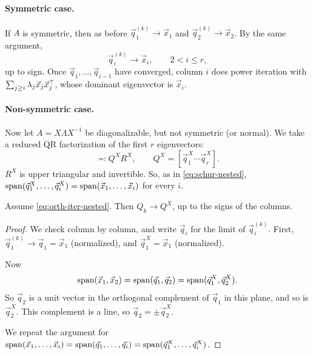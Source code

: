 \paragraph{Symmetric case.} If $A$ is symmetric, then as before $\vec{q}_1^{(k)} \to \vec{x}_1$ and $\vec{q}_2^{(k)} \to \vec{x}_2$. By the same argument,
\begin{equation}
  \vec{q}_i^{(k)} \longrightarrow \vec{x}_i, \qquad 2 < i \le r,
\end{equation}
up to sign. Once $\vec{q}_1, \dots, \vec{q}_{i-1}$ have converged, column $i$ does power iteration with $\sum_{j \ge i}\lambda_j\vec{x}_j\vec{x}_j^\top$, whose dominant eigenvector is $\vec{x}_i$.

\paragraph{Non-symmetric case.} Now let $A = X\Lambda X^{-1}$ be diagonalizable, but not symmetric (or normal). We take a reduced QR factorization of the first $r$ eigenvectors:
\begin{equation}
  [\vec{x}_1 \cdots \vec{x}_r] \eqqcolon Q^XR^X, \qquad Q^X = [\vec{q}_1^X \cdots \vec{q}_r^X].
  \label{eq:orth-iter-QX}
\end{equation}
$R^X$ is upper triangular and invertible. So, as in \cref{eq:schur-nested}, $\operatorname{span}(\vec{q}_1^X, \dots, \vec{q}_i^X) = \operatorname{span}(\vec{x}_1, \dots, \vec{x}_i)$ for every $i$.

\begin{proposition}
  \label{prop:orth-iter-QX}
  Assume \cref{eq:orth-iter-nested}. Then $Q_k \to Q^X$, up to the signs of the columns.
\end{proposition}

\begin{proof}
  We check column by column, and write $\vec{q}_i$ for the limit of $\vec{q}_i^{(k)}$. First, $\vec{q}_1^{(k)} \to \vec{q}_1 = \vec{x}_1$ (normalized), and $\vec{q}_1^X = \vec{x}_1$ (normalized).

  Now
  \begin{equation}
    \operatorname{span}(\vec{x}_1, \vec{x}_2) = \operatorname{span}(\vec{q}_1, \vec{q}_2) = \operatorname{span}(\vec{q}_1^X, \vec{q}_2^X).
  \end{equation}
  So $\vec{q}_2$ is a unit vector in the orthogonal complement of $\vec{q}_1$ in this plane, and so is $\vec{q}_2^X$. This complement is a line, so $\vec{q}_2 = \pm\vec{q}_2^X$.

  We repeat the argument for $\operatorname{span}(\vec{x}_1, \dots, \vec{x}_i) = \operatorname{span}(\vec{q}_1, \dots, \vec{q}_i) = \operatorname{span}(\vec{q}_1^X, \dots, \vec{q}_i^X)$.
\end{proof}

